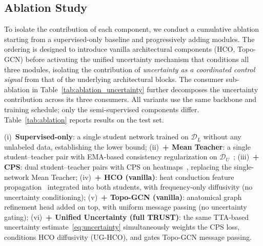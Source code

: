 \documentclass[conference]{IEEEtran}
\begin{document}
\subsection{Ablation Study}
\label{sec:ablation}

To isolate the contribution of each component, we conduct a cumulative ablation starting from a supervised-only baseline and progressively adding modules. The ordering is designed to introduce vanilla architectural components (HCO, Topo-GCN) before activating the unified uncertainty mechanism that conditions all three modules, isolating the contribution of \emph{uncertainty as a coordinated control signal} from that of the underlying architectural blocks. The consumer sub-ablation in Table~\ref{tab:ablation_uncertainty} further decomposes the uncertainty contribution across its three consumers. All variants use the same backbone and training schedule; only the semi-supervised components differ. Table~\ref{tab:ablation} reports results on the test set.

(i)~\textbf{Supervised-only}: a single student network trained on $\mathcal{D}_L$ without any unlabeled data, establishing the lower bound;
(ii)~\textbf{+ Mean Teacher}: a single student--teacher pair with EMA-based consistency regularization on $\mathcal{D}_U$~\cite{Tarvainen2017_mean_teacher};
(iii)~\textbf{+ CPS}: dual student--teacher pairs with CPS on heatmaps~\cite{Chen2021_cps,Ren2024_g2lcps}, replacing the single-network Mean Teacher;
(iv)~\textbf{+ HCO (vanilla)}: heat conduction feature propagation~\cite{wang2025building} integrated into both students, with frequency-only diffusivity (no uncertainty conditioning);
(v)~\textbf{+ Topo-GCN (vanilla)}: anatomical graph refinement head added on top, with uniform message passing (no uncertainty gating);
(vi)~\textbf{+ Unified Uncertainty (full TRUST)}: the same TTA-based uncertainty estimate~\eqref{eq:uncertainty} simultaneously weights the CPS loss, conditions HCO diffusivity (UG-HCO), and gates Topo-GCN message passing.
\end{document}

